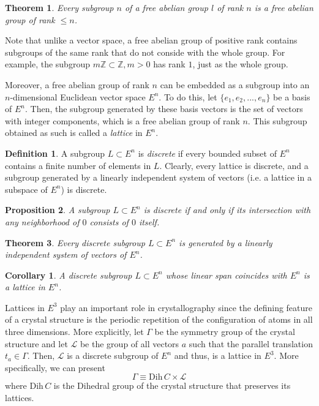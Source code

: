\documentclass{article}
\newtheorem{theorem}{Theorem}[section]
\newtheorem{proposition}[theorem]{Proposition}
\newtheorem{corollary}{Corollary}[theorem]
\theoremstyle{remark}
\theoremstyle{definition}
\newtheorem{definition}{Definition}[section]
\begin{document}
\begin{theorem}
Every subgroup $n$ of a free abelian group $l$ of rank $n$ is a free abelian group of rank $ \leq n$. 
\end{theorem}

Note that unlike a vector space, a free abelian group of positive rank contains subgroups of the same rank that do not conside with the whole group. For example, the subgroup $m \mathbb{Z} \subset \mathbb{Z}, m > 0$ has rank $1$, just as the whole group. 

Moreover, a free abelian group of rank $n$ can be embedded as a subgroup into an $n$-dimensional Euclidean vector space $E^n$. To do this, let $\{e_1, e_2, ..., e_n\}$ be a basis of $E^n$. Then, the subgroup generated by these basis vectors is the set of vectors with integer components, which is a free abelian group of rank $n$. This subgroup obtained as such is called a \textit{lattice} in $E^n$. 

\begin{definition}
A subgroup $L \subset E^n$ is \textit{discrete} if every bounded subset of $E^n$ contains a finite number of elements in $L$. Clearly, every lattice is discrete, and a subgroup generated by a linearly independent system of vectors (i.e. a lattice in a subspace of $E^n$) is discrete. 
\end{definition}

\begin{proposition}
A subgroup $L \subset E^n$ is discrete if and only if its intersection with any neighborhood of $0$ consists of $0$ itself. 
\end{proposition}

\begin{theorem}
Every discrete subgroup $L \subset E^n$ is generated by a linearly independent system of vectors of $E^n$. 
\end{theorem}

\begin{corollary}
A discrete subgroup $L \subset E^n$ whose linear span coincides with $E^n$ is a lattice in $E^n$. 
\end{corollary}

Lattices in $E^3$ play an important role in crystallography since the defining feature of a crystal structure is the periodic repetition of the configuration of atoms in all three dimensions. More explicitly, let $\Gamma$ be the symmetry group of the crystal structure and let $\mathcal{L}$ be the group of all vectors $a$ such that the parallel translation $t_a \in \Gamma$. Then, $\mathcal{L}$ is a discrete subgroup of $E^n$ and thus, is a lattice in $E^3$. More specifically, we can present 
\[ \Gamma \equiv \text{Dih}\,C \times \mathcal{L}\]
where Dih$\, C$ is the Dihedral group of the crystal structure that preserves its lattices. 
\end{document}
